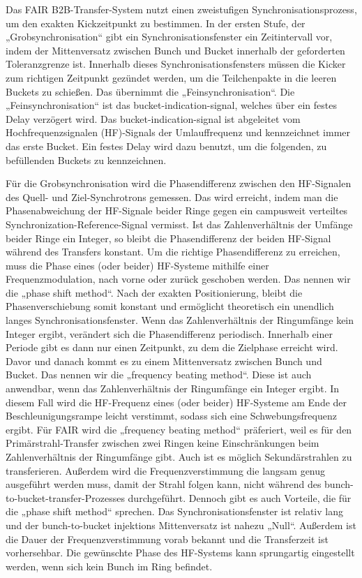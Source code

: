Das FAIR B2B-Transfer-System nutzt einen zweistufigen Synchronisationsprozess, um den exakten Kickzeitpunkt zu bestimmen. In der ersten Stufe, der „Grobsynchronisation“ gibt ein Synchronisationsfenster ein Zeitintervall vor, indem der Mittenversatz zwischen Bunch und Bucket innerhalb der geforderten Toleranzgrenze ist. Innerhalb dieses Synchronisationsfensters m\"ussen die Kicker zum richtigen Zeitpunkt gez\"undet werden, um die Teilchenpakte in die leeren Buckets zu schie\ss{}en. Das \"ubernimmt die „Feinsynchronisation“.
Die „Feinsynchronisation“ ist das bucket-indication-signal, welches \"uber ein festes Delay verz\"ogert wird. Das bucket-indication-signal ist abgeleitet vom Hochfrequenzsignalen (HF)-Signals der Umlauffrequenz und kennzeichnet immer das erste Bucket. Ein festes Delay wird dazu benutzt, um die folgenden, zu bef\"ullenden Buckets zu kennzeichnen. 

F\"ur die Grobsynchronisation wird die Phasendifferenz zwischen den HF-Signalen des Quell- und Ziel-Synchrotrons gemessen. Das wird erreicht, indem man die Phasenabweichung der HF-Signale beider Ringe gegen ein campusweit verteiltes Synchronization-Reference-Signal vermisst. Ist das Zahlenverh\"altnis der Umf\"ange beider Ringe ein Integer, so bleibt die Phasendifferenz der beiden HF-Signal w\"ahrend des Transfers konstant. Um die richtige Phasendifferenz zu erreichen, muss die Phase eines (oder beider) HF-Systeme mithilfe einer Frequenzmodulation, nach vorne oder zur\"uck geschoben werden. Das nennen wir die „phase shift method“. Nach der exakten Positionierung, bleibt die Phasenverschiebung somit konstant und erm\"oglicht theoretisch ein unendlich langes Synchronisationsfenster. Wenn das Zahlenverh\"altnis der Ringumf\"ange kein Integer ergibt, ver\"andert sich die Phasendifferenz periodisch. Innerhalb einer Periode gibt es dann nur einen Zeitpunkt, zu dem die Zielphase erreicht wird. Davor und danach kommt es zu einem Mittenversatz zwischen Bunch und Bucket. Das nennen wir die „frequency beating method“. Diese ist auch anwendbar, wenn das Zahlenverh\"altnis der Ringumf\"ange ein Integer ergibt. In diesem Fall wird die HF-Frequenz eines (oder beider) HF-Systeme am Ende der Beschleunigungsrampe leicht verstimmt, sodass sich eine Schwebungsfrequenz ergibt. F\"ur FAIR wird die „frequency beating method“ pr\"aferiert, weil es f\"ur den Prim\"arstrahl-Transfer zwischen zwei Ringen keine Einschr\"ankungen beim Zahlenverh\"altnis der Ringumf\"ange gibt. Auch ist es m\"oglich Sekund\"arstrahlen zu transferieren. Au\ss{}erdem wird die Frequenzverstimmung die langsam genug ausgef\"uhrt werden muss, damit der Strahl folgen kann, nicht w\"ahrend des bunch-to-bucket-transfer-Prozesses durchgef\"uhrt. Dennoch gibt es auch Vorteile, die f\"ur die „phase shift method“ sprechen. Das Synchronisationsfenster ist relativ lang und der bunch-to-bucket injektions Mittenversatz ist nahezu „Null“. Au\ss{}erdem ist die Dauer der Frequenzverstimmung vorab bekannt und die Transferzeit ist vorhersehbar. Die gew\"unschte Phase des HF-Systems kann sprungartig eingestellt werden, wenn sich kein Bunch im Ring befindet.

